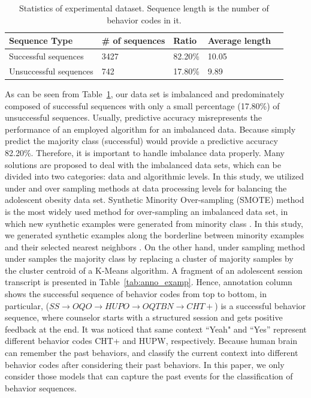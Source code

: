 \documentclass{amia_summit_2018}
\begin{document}
\begin{table}[h]
\centering
\caption{Statistics of experimental dataset. Sequence length is the number of behavior codes in it.}
\label{tab:data_dist}
  \begin{tabular}{|l|l|l|l|l|}
  \hline
   \textbf{Sequence Type} & \textbf{\# of sequences}  & \textbf{Ratio} & \textbf{Average length} \\ \hline      
Successful sequences & 3427 & 82.20\% & 10.05 \\\hline
Unsuccessful sequences & 742 & 17.80\% & 9.89 \\\hline
  \end{tabular}
\end{table} 

As can be seen from Table~\ref{tab:data_dist}, our data set is imbalanced and predominately composed of successful sequences with only a small percentage (17.80\%) of unsuccessful sequences. Usually, predictive accuracy misrepresents the performance of an employed algorithm for an imbalanced data. Because simply predict the majority class (successful) would provide a predictive accuracy 82.20\%. Therefore, it is important to handle imbalance data properly. Many solutions are proposed to deal with the imbalanced data sets, which can be divided into two categories: data and algorithmic levels. In this study, we utilized under and over sampling methods at data processing levels for balancing the adolescent obesity data set. Synthetic Minority Over-sampling (SMOTE) method is the most widely used method for over-sampling an imbalanced data set, in which new synthetic examples were generated from minority class \cite{chawla2002smote}. In this study, we generated synthetic examples along the borderline between minority examples and their selected nearest neighbors \cite{nguyen2011borderline}. On the other hand, under sampling method under samples the majority class by replacing a cluster of majority samples by the cluster centroid of a K-Means algorithm.  A fragment of an adolescent session transcript is presented in Table~\ref{tab:anno_examp}. Hence, annotation column shows the successful sequence of behavior codes from top to bottom, in particular, ($SS\rightarrow OQO\rightarrow HUPO\rightarrow OQTBN\rightarrow CHT+$) is a successful behavior sequence, where counselor starts with a structured session and gets positive feedback at the end. It was noticed that same context ``Yeah" and ``Yes'' represent different behavior codes CHT+ and HUPW, respectively. Because human brain can remember the past behaviors, and classify the current context into different behavior codes after considering their past behaviors. In this paper, we only consider those models that can capture the past events for the classification of behavior sequences.\\
\end{document}
